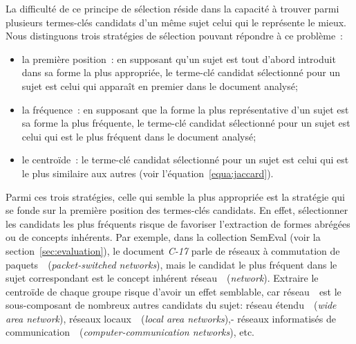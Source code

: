    La difficulté de ce principe de sélection réside dans la capacité à trouver
    parmi plusieurs termes-clés candidats d'un même sujet celui qui le
    représente le mieux. Nous distinguons trois stratégies de sélection pouvant
    répondre à ce problème~:
    \begin{itemize}
      \item{la première position~: en supposant qu'un sujet est tout d'abord
            introduit dans sa forme la plus appropriée, le terme-clé candidat
            sélectionné pour un sujet est celui qui apparaît en premier dans le
            document analysé;}
      \item{la fréquence~: en supposant que la forme la plus représentative d'un
            sujet est sa forme la plus fréquente, le terme-clé candidat
            sélectionné pour un sujet est celui qui est le plus fréquent dans le
            document analysé;}
      \item{le centroïde~: le terme-clé candidat sélectionné pour un sujet est
            celui qui est le plus similaire aux autres (voir
            l'équation~\ref{equa:jaccard}).}
    \end{itemize}
    Parmi ces trois stratégies, celle qui semble la plus appropriée est la
    stratégie qui se fonde sur la première position des termes-clés candidats.
    En effet, sélectionner les candidats les plus fréquents risque de favoriser
    l'extraction de formes abrégées ou de concepts inhérents. Par exemple, dans
    la collection SemEval (voir la section~\ref{sec:evaluation}), le document
    \textit{C-17} parle de \og réseaux à commutation de
    paquets~\fg\ (\textit{packet-switched networks}), mais le candidat le plus
    fréquent dans le sujet correspondant est le concept inhérent
    \og réseau~\fg\ (\textit{network}). Extraire le centroïde de chaque groupe
    risque d'avoir un effet semblable, car \og réseau~\fg\ est le sous-composant
    de nombreux autres candidats du sujet:
    \og réseau étendu~\fg\ (\textit{wide area network}),
    \og réseaux locaux~\fg\ (\textit{local area networks}),-
    \og réseaux informatisés de communication~\fg\ (\textit{computer-communication networks}),
    etc.


